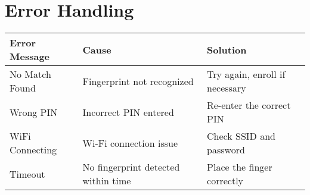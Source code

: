 \documentclass[a4paper,12pt]{article}
\begin{document}
\section{Error Handling}
\begin{tabular}{|l|l|l|}
\hline
\textbf{Error Message} & \textbf{Cause} & \textbf{Solution} \\
\hline
No Match Found & Fingerprint not recognized & Try again, enroll if necessary \\
Wrong PIN & Incorrect PIN entered & Re-enter the correct PIN \\
WiFi Connecting & Wi-Fi connection issue & Check SSID and password \\
Timeout & No fingerprint detected within time & Place the finger correctly \\
\hline
\end{tabular}
\end{document}
